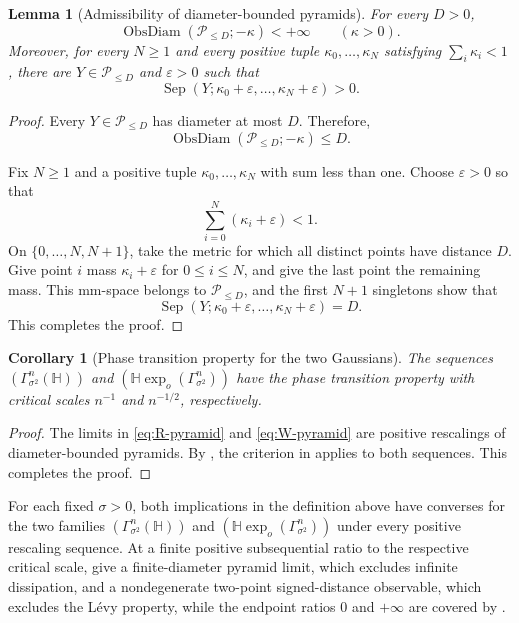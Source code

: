 \documentclass{amsart}
\numberwithin{equation}{section}
\theoremstyle{plain}
\newtheorem{lem}[thm]{Lemma}
\newtheorem{cor}[thm]{Corollary}
\theoremstyle{definition}
\theoremstyle{remark}
\newcommand{\Hyp}{\mathbb{H}}
\newcommand{\RGauss}[2]{\Gamma^{#1}_{#2^2}(\Hyp)}
\newcommand{\WGauss}[2]{\Hyp\exp_o(\Gamma^{#1}_{#2^2})}
\newcommand{\eps}{\varepsilon}
\DeclareMathOperator{\Sep}{Sep}
\DeclareMathOperator{\ObsDiam}{ObsDiam}
\begin{document}
\begin{lem}[Admissibility of diameter-bounded pyramids]
\label{lem:diameter-pyramid-admissible}
	For every $D>0$,
\[ \ObsDiam(\mathcal P_{\le D};-\kappa)<+\infty \qquad(\kappa>0). \]
	Moreover, for every $N\ge1$ and every positive tuple
	$\kappa_0,\ldots,\kappa_N$ satisfying $\sum_i\kappa_i<1$, there are
	$Y\in\mathcal P_{\le D}$ and $\eps>0$ such that
	\[
		\Sep(Y;\kappa_0+\eps,\ldots,\kappa_N+\eps)>0.
	\]
\end{lem}

\begin{proof}
	Every $Y\in\mathcal P_{\le D}$ has diameter at most $D$.  Therefore,
	\[
		\ObsDiam(\mathcal P_{\le D};-\kappa)\le D.
	\]

	Fix $N\ge1$ and a positive tuple
	$\kappa_0,\ldots,\kappa_N$ with sum less than one.  Choose $\eps>0$ so
	that
	\[
		\sum_{i=0}^N(\kappa_i+\eps)<1.
	\]
	On $\{0,\ldots,N,N+1\}$, take the metric for which all distinct points
	have distance $D$.  Give point $i$ mass $\kappa_i+\eps$ for
	$0\le i\le N$, and give the last point the remaining mass.  This
	mm-space belongs to $\mathcal P_{\le D}$, and the first $N+1$
	singletons show that
	\[
		\Sep(Y;\kappa_0+\eps,\ldots,\kappa_N+\eps)=D.
	\]
	This completes the proof.
\end{proof}

\begin{cor}[Phase transition property for the two Gaussians]
\label{thm:gaussian-ptp}
	The sequences $(\RGauss{n}{\sigma})$ and
	$(\WGauss{n}{\sigma})$ have the phase transition property with
	critical scales $n^{-1}$ and $n^{-1/2}$, respectively.
\end{cor}

\begin{proof}
	The limits in \eqref{eq:R-pyramid} and \eqref{eq:W-pyramid} are positive
	rescalings of diameter-bounded pyramids.  By
	, the criterion in
	 applies to both sequences.
	This completes the proof.
\end{proof}

For each fixed $\sigma>0$, both implications in the definition above have converses for the two families $(\RGauss{n}{\sigma})$ and $(\WGauss{n}{\sigma})$ under every positive rescaling sequence. At a finite positive subsequential ratio to the respective critical scale,  give a finite-diameter pyramid limit, which excludes infinite dissipation, and a nondegenerate two-point signed-distance observable, which excludes the L\'evy property, while the endpoint ratios $0$ and $+\infty$ are covered by .
\end{document}
